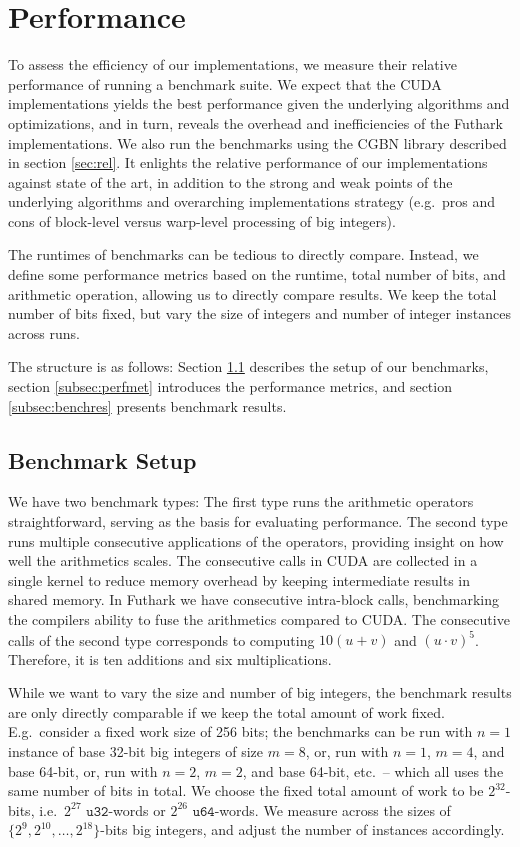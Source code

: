 \section{Performance}
\label{sec:per}

To assess the efficiency of our implementations, we measure their relative
performance of running a benchmark suite. We expect that the CUDA
implementations yields the best performance given the underlying algorithms and
optimizations, and in turn, reveals the overhead and inefficiencies of the
Futhark implementations. We also run the benchmarks using the CGBN library
described in section \ref{sec:rel}. It enlights the relative performance of our
implementations against state of the art, in addition to the strong and weak
points of the underlying algorithms and overarching implementations strategy
(e.g.\ pros and cons of block-level versus warp-level processing of big
integers).

The runtimes of benchmarks can be tedious to directly compare. Instead, we
define some performance metrics based on the runtime, total number of bits, and
arithmetic operation, allowing us to directly compare results. We keep the total
number of bits fixed, but vary the size of integers and number of integer
instances across runs.

The structure is as follows: Section \ref{subsec:benchset} describes the setup
of our benchmarks, section \ref{subsec:perfmet} introduces the performance
metrics, and section \ref{subsec:benchres} presents benchmark results.

\subsection{Benchmark Setup}
\label{subsec:benchset}

We have two benchmark types: The first type runs the arithmetic operators
straightforward, serving as the basis for evaluating performance. The second
type runs multiple consecutive applications of the operators, providing insight
on how well the arithmetics scales. The consecutive calls in CUDA are collected
in a single kernel to reduce memory overhead by keeping intermediate results in
shared memory. In Futhark we have consecutive intra-block calls, benchmarking
the compilers ability to fuse the arithmetics compared to CUDA. The consecutive
calls of the second type corresponds to computing $10(u+v)$ and $(u\cdot
v)^5$. Therefore, it is ten additions and six multiplications.

While we want to vary the size and number of big integers, the benchmark results
are only directly comparable if we keep the total amount of work fixed. E.g.\
consider a fixed work size of 256 bits; the benchmarks can be run with $n=1$
instance of base 32-bit big integers of size $m=8$, or, run with $n=1$, $m=4$,
and base 64-bit, or, run with $n=2$, $m=2$, and base 64-bit, etc.\ -- which all
uses the same number of bits in total. We choose the fixed total amount of work
to be $2^{32}$-bits, i.e.\ $2^{27}$ $\mathtt{u32}$-words or $2^{26}$
$\mathtt{u64}$-words. We measure across the sizes of
$\{2^9,2^{10},\ldots,2^{18}\}$-bits big integers, and adjust the number of instances
accordingly.


